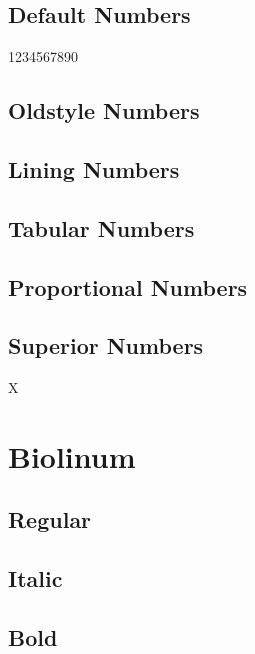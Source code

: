 \documentclass{article}
\begin{document}
\subsection*{Default Numbers}

1234567890

\subsection*{Oldstyle Numbers}


\subsection*{Lining Numbers}


\subsection*{Tabular Numbers}


\subsection*{Proportional Numbers}


\subsection*{Superior Numbers}

X


\clearpage
\section{Biolinum}\sf


\subsection*{Regular}
\lipsum[1]


\subsection*{Italic}
\textit{\lipsum[2]}

\subsection*{Bold}
\textbf{\lipsum[3]}
\end{document}

